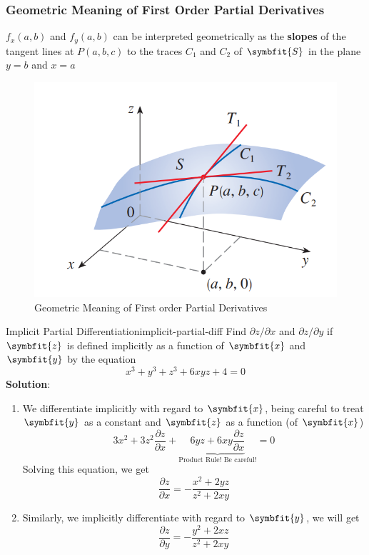 \documentclass[math,code]{amznotes}
\theoremstyle{remark}
\begin{document}
\subsubsection{Geometric Meaning of First Order Partial Derivatives}
$f_x(a,b)$ and $f_y(a,b)$ can be interpreted geometrically as the {\color{red} \textbf{slopes}} of the tangent lines at $P(a,b,c)$ to the traces $C_1$ and $C_2$ of $\symbfit{S}$ in the plane $y=b$ and $x=a$
\begin{figure}[H]
    \centering
    \includegraphics[width=0.5\linewidth]{images/partial-derivative-geometric-meaning.png}
    \caption{Geometric Meaning of First order Partial Derivatives}
    \label{fig:geo-meaning-first-order-partial-derivative}
\end{figure}
\begin{exbox}{Implicit Partial Differentiation}{implicit-partial-diff}
    Find $\partial z / \partial x$ and $\partial z / \partial y$ if $\symbfit{z}$ is defined implicitly as a function of $\symbfit{x}$ and $\symbfit{y}$ by the equation
    \begin{displaymath}
        x^3+y^3+z^3+6xyz+4=0
    \end{displaymath}
    {\color{blue} \textbf{Solution}}:
    \begin{enumerate}
        \item We differentiate implicitly with regard to $\symbfit{x}$, being careful to treat $\symbfit{y}$ as a constant and $\symbfit{z}$ as a function (of $\symbfit{x}$)
        \begin{displaymath}
            3x^2+3z^2\frac{\partial z}{\partial x}+\underbrace{6yz+6xy\frac{\partial z}{\partial x}}_\text{Product Rule! Be careful!}=0
        \end{displaymath}
        Solving this equation, we get
        \begin{displaymath}
            \frac{\partial z}{\partial x}=-\frac{x^2+2yz}{z^2+2xy}
        \end{displaymath}
        \item Similarly, we implicitly differentiate with regard to $\symbfit{y}$, we will get
        \begin{displaymath}
            \frac{\partial z}{\partial y}=-\frac{y^2+2xz}{z^2+2xy}
        \end{displaymath}
    \end{enumerate}
\end{exbox}
\end{document}
